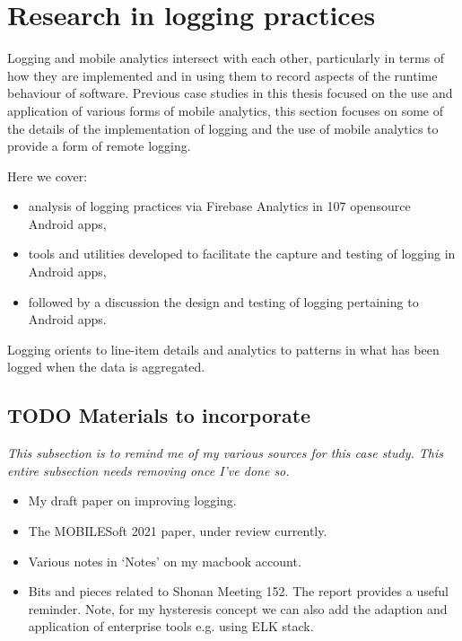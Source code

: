 \section{Research in logging practices}
\label{section-research-in-logging-practices}
Logging and mobile analytics intersect with each other, particularly in terms of how they are implemented and in using them to record aspects of the runtime behaviour of software. Previous case studies in this thesis focused on the use and application of various forms of mobile analytics, this section focuses on some of the details of the implementation of logging and the use of mobile analytics to provide a form of remote logging. 

Here we cover:
\begin{itemize}
    \item analysis of logging practices via Firebase Analytics in 107 opensource Android apps,
    \item tools and utilities developed to facilitate the capture and testing of logging in Android apps,
    \item followed by a discussion the design and testing of logging pertaining to Android apps.
\end{itemize}

Logging orients to line-item details and analytics to patterns in what has been logged when the data is aggregated.

\subsection{TODO Materials to incorporate}
\textit{This subsection is to remind me of my various sources for this case study. This entire subsection needs removing once I've done so.}
\begin{itemize}
    \item My draft paper on improving logging.
    \item The MOBILESoft 2021 paper, under review currently.
    \item Various notes in `Notes' on my macbook account.
    \item Bits and pieces related to Shonan Meeting 152. The report provides a useful reminder. Note, for my hysteresis concept we can also add the adaption and application of enterprise tools e.g. using ELK stack.  
\end{itemize}


